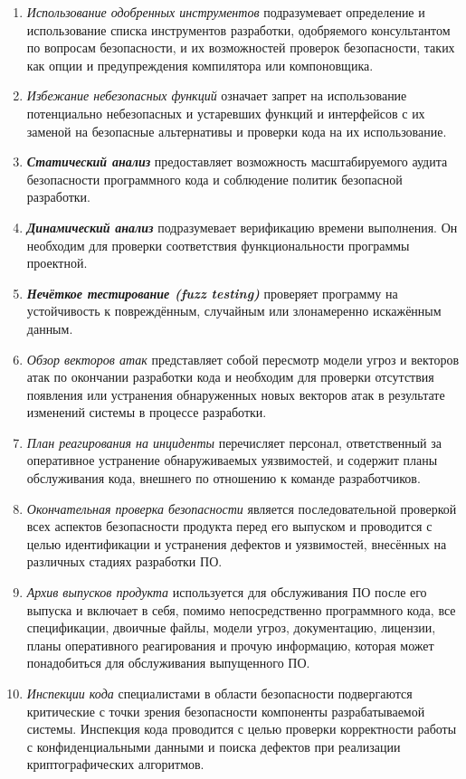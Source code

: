 \begin{enumerate}
 \item \textit{Использование одобренных инструментов} подразумевает определение и использование списка инструментов разработки, одобряемого консультантом по вопросам безопасности, и их возможностей проверок безопасности, таких как опции и предупреждения компилятора или компоновщика.
 \item \textit{Избежание небезопасных функций} означает запрет на использование потенциально небезопасных и устаревших функций и интерфейсов с их заменой на безопасные альтернативы и проверки кода на их использование.
 \item \textit{\textbf{Статический анализ}} предоставляет возможность масштабируемого аудита безопасности программного кода и соблюдение политик безопасной разработки.
 \item \textit{\textbf{Динамический анализ}} подразумевает верификацию времени выполнения. Он необходим для проверки соответствия функциональности программы проектной.
 \item \textit{\textbf{Нечёткое тестирование (fuzz testing)}} проверяет программу на устойчивость к повреждённым, случайным или злонамеренно искажённым данным.
 \item \textit{Обзор векторов атак} представляет собой пересмотр модели угроз  и векторов атак по окончании разработки кода и необходим для проверки отсутствия появления или устранения обнаруженных новых векторов атак в результате изменений системы в процессе разработки.
 \item \textit{План реагирования на инциденты} перечисляет персонал, ответственный за оперативное устранение обнаруживаемых уязвимостей, и содержит планы обслуживания кода, внешнего по отношению к команде разработчиков.
 \item \textit{Окончательная проверка безопасности} является последовательной проверкой всех аспектов безопасности продукта перед его выпуском и проводится с целью идентификации и устранения дефектов и уязвимостей, внесённых на различных стадиях разработки ПО.
 \item \textit{Архив выпусков продукта} используется для обслуживания ПО после его выпуска и включает в себя, помимо непосредственно программного кода, все спецификации, двоичные файлы, модели угроз, документацию, лицензии, планы оперативного реагирования и прочую информацию, которая может понадобиться для обслуживания выпущенного ПО.
 \item \textit{Инспекции кода} специалистами в области безопасности подвергаются критические с точки зрения безопасности компоненты разрабатываемой системы. Инспекция кода проводится с целью проверки корректности работы с конфиденциальными данными и поиска дефектов при реализации криптографических алгоритмов. 
\end{enumerate}

